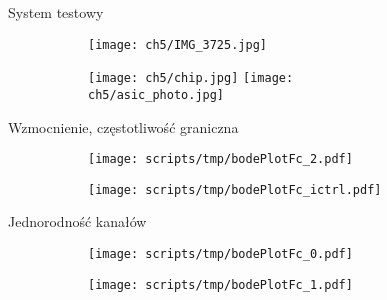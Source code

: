 \begin{frame}{System testowy}

    \begin{figure}[H]
        \centering
        \begin{subfigure}[b]{0.65\textwidth}
            \centering
            \texttt{[image: ch5/IMG\_3725.jpg]}
        \end{subfigure}
        \hfill
        \begin{subfigure}[b]{0.3\textwidth}
            \centering
            \texttt{[image: ch5/chip.jpg]} 
            \texttt{[image: ch5/asic\_photo.jpg]}
        \end{subfigure}     

   \end{figure}
\end{frame}


\begin{frame}{Wzmocnienie, częstotliwość graniczna}

    \begin{figure}[H]
        \centering
        \begin{subfigure}[b]{0.485\textwidth}
            \centering
            \texttt{[image: scripts/tmp/bodePlotFc\_2.pdf]}  

        \end{subfigure}
        \begin{subfigure}[b]{0.485\textwidth}
            \centering
            \texttt{[image: scripts/tmp/bodePlotFc\_ictrl.pdf]}

        \end{subfigure}     

    \end{figure}


\end{frame}

\begin{frame}{Jednorodność kanałów}
    \begin{figure}[H]
        \centering
        \begin{subfigure}[b]{0.485\textwidth}
            \centering
            \texttt{[image: scripts/tmp/bodePlotFc\_0.pdf]}

        \end{subfigure}
        \begin{subfigure}[b]{0.485\textwidth}
            \centering
            \texttt{[image: scripts/tmp/bodePlotFc\_1.pdf]}

        \end{subfigure}     
    \end{figure}
\end{frame}


